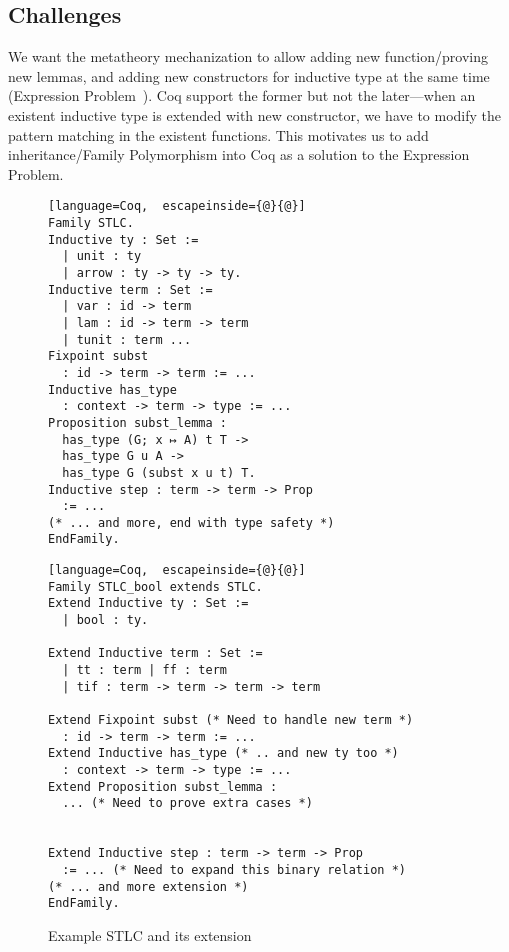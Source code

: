 \subsection{Challenges}

We want the metatheory mechanization to allow adding new function/proving new lemmas, and adding new constructors for inductive type at the same time  (Expression Problem~\cite{wadler-ep}). Coq support the former but not the later---when an existent inductive type is extended with new constructor, we have to modify the pattern matching in the existent functions. This motivates us to add inheritance/Family Polymorphism into Coq as a solution to the Expression Problem. 

\begin{figure}[!htb]
  \begin{minipage}[t]{0.47\linewidth}
\begin{lstlisting}[language=Coq,  escapeinside={@}{@}]
Family STLC.
Inductive ty : Set :=
  | unit : ty
  | arrow : ty -> ty -> ty.
Inductive term : Set := 
  | var : id -> term 
  | lam : id -> term -> term 
  | tunit : term ...
Fixpoint subst 
  : id -> term -> term := ...
Inductive has_type 
  : context -> term -> type := ...
Proposition subst_lemma :
  has_type (G; x ↦ A) t T ->
  has_type G u A ->
  has_type G (subst x u t) T.
Inductive step : term -> term -> Prop 
  := ...
(* ... and more, end with type safety *)
EndFamily.
\end{lstlisting}
  \end{minipage}
  \begin{minipage}[t]{0.47\linewidth}
\begin{lstlisting}[language=Coq,  escapeinside={@}{@}]
Family STLC_bool extends STLC.
Extend Inductive ty : Set :=
  | bool : ty.

Extend Inductive term : Set := 
  | tt : term | ff : term 
  | tif : term -> term -> term -> term

Extend Fixpoint subst (* Need to handle new term *)
  : id -> term -> term := ...
Extend Inductive has_type (* .. and new ty too *)
  : context -> term -> type := ...
Extend Proposition subst_lemma :
  ... (* Need to prove extra cases *)


Extend Inductive step : term -> term -> Prop 
  := ... (* Need to expand this binary relation *)
(* ... and more extension *)
EndFamily.
\end{lstlisting}
  \end{minipage}
  \caption{Example STLC and its extension}\label{fig:STLC-example}
\end{figure}


